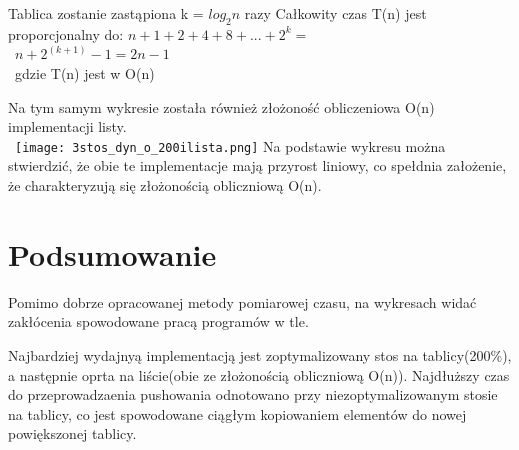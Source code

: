 \documentclass[11pt]{article}
\begin{document}
Tablica zostanie zastąpiona k = $log_2n$ razy
Całkowity czas T(n) jest proporcjonalny do:
$n+1+2+4+8+...+2^k = $\\\
$n+2^(k+1) -1 = 2n-1$\\\
gdzie T(n) jest w O(n)


Na tym samym wykresie została również złożoność obliczeniowa O(n) implementacji listy.\\\
\texttt{[image: 3stos\_dyn\_o\_200ilista.png]}
Na podstawie wykresu można stwierdzić, że obie te implementacje mają przyrost liniowy, co spełdnia założenie, że charakteryzują się złożonością obliczniową O(n).
\section{Podsumowanie}
Pomimo dobrze opracowanej metody pomiarowej czasu, na wykresach widać zakłócenia spowodowane pracą programów w tle.


Najbardziej wydajnyą implementacją jest zoptymalizowany stos na tablicy(200\%), a następnie oprta na liście(obie ze złożonością obliczniową O(n)). Najdłuższy czas do przeprowadzaenia pushowania odnotowano przy niezoptymalizowanym stosie na tablicy, co jest spowodowane ciągłym kopiowaniem elementów do nowej powiększonej tablicy.
\end{document}
